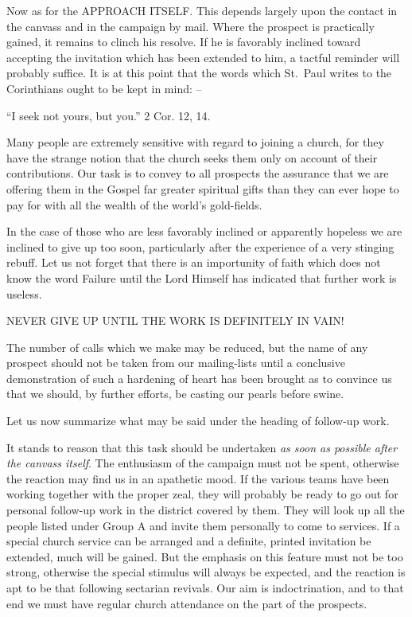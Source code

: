\documentclass[
]{book}
\begin{document}
Now as for the APPROACH ITSELF. This depends largely upon the contact in the canvass and in the campaign by mail. Where the prospect is practically gained, it remains to clinch his resolve. If he is favorably inclined toward accepting the invitation which has been extended to him, a tactful reminder will probably suffice. It is at this point that the words which St.~Paul writes to the Corinthians ought to be kept in mind: --

``I seek not yours, but you.'' 2 Cor. 12, 14.

Many people are extremely sensitive with regard to joining a church, for they have the strange notion that the church seeks them only on account of their contributions. Our task is to convey to all prospects the assurance that we are offering them in the Gospel far greater spiritual gifts than they can ever hope to pay for with all the wealth of the world's gold-fields.

In the case of those who are less favorably inclined or apparently hopeless we are inclined to give up too soon, particularly after the experience of a very stinging rebuff. Let us not forget that there is an importunity of faith which does not know the word Failure until the Lord Himself has indicated that further work is useless.

NEVER GIVE UP UNTIL THE WORK IS DEFINITELY IN VAIN!

The number of calls which we make may be reduced, but the name of any prospect should not be taken from our mailing-lists until a conclusive demonstration of such a hardening of heart has been brought as to convince us that we should, by further efforts, be casting our pearls before swine.

Let us now summarize what may be said under the heading of follow-up work.

It stands to reason that this task should be undertaken \emph{as soon as possible after the canvass itself}. The enthusiasm of the campaign must not be spent, otherwise the reaction may find us in an apathetic mood. If the various teams have been working together with the proper zeal, they will probably be ready to go out for personal follow-up work in the district covered by them. They will look up all the people listed under Group A and invite them personally to come to services. If a special church service can be arranged and a definite, printed invitation be extended, much will be gained. But the emphasis on this feature must not be too strong, otherwise the special stimulus will always be expected, and the reaction is apt to be that following sectarian revivals. Our aim is indoctrination, and to that end we must have regular church attendance on the part of the prospects.
\end{document}

